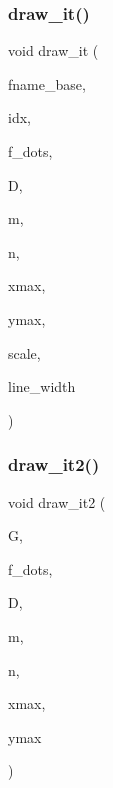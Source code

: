 \subsubsection{\texorpdfstring{draw\+\_\+it()}{draw\_it()}}
{\footnotesize\ttfamily void draw\+\_\+it (\begin{DoxyParamCaption}\item[{const \mbox{\hyperlink{galois_8h_ab6cc7b4aeb6ea31aba2b3fbfc83ff5e6}{B\+Y\+TE}} $\ast$}]{fname\+\_\+base,  }\item[{\mbox{\hyperlink{galois_8h_a09fddde158a3a20bd2dcadb609de11dc}{I\+NT}}}]{idx,  }\item[{\mbox{\hyperlink{galois_8h_a09fddde158a3a20bd2dcadb609de11dc}{I\+NT}}}]{f\+\_\+dots,  }\item[{\mbox{\hyperlink{galois_8h_a122c4acf389c050379f00341fdcd5812}{U\+B\+Y\+TE}} $\ast$}]{D,  }\item[{\mbox{\hyperlink{galois_8h_a09fddde158a3a20bd2dcadb609de11dc}{I\+NT}}}]{m,  }\item[{\mbox{\hyperlink{galois_8h_a09fddde158a3a20bd2dcadb609de11dc}{I\+NT}}}]{n,  }\item[{\mbox{\hyperlink{galois_8h_a09fddde158a3a20bd2dcadb609de11dc}{I\+NT}}}]{xmax,  }\item[{\mbox{\hyperlink{galois_8h_a09fddde158a3a20bd2dcadb609de11dc}{I\+NT}}}]{ymax,  }\item[{double}]{scale,  }\item[{double}]{line\+\_\+width }\end{DoxyParamCaption})}

\mbox{\label{plot__decomposition__matrix_8_c_ac1625003fdeabc86385385f169bd3e21}} 
\subsubsection{\texorpdfstring{draw\+\_\+it2()}{draw\_it2()}}
{\footnotesize\ttfamily void draw\+\_\+it2 (\begin{DoxyParamCaption}\item[{\mbox{\hyperlink{classmp__graphics}{mp\+\_\+graphics}} \&}]{G,  }\item[{\mbox{\hyperlink{galois_8h_a09fddde158a3a20bd2dcadb609de11dc}{I\+NT}}}]{f\+\_\+dots,  }\item[{\mbox{\hyperlink{galois_8h_a122c4acf389c050379f00341fdcd5812}{U\+B\+Y\+TE}} $\ast$}]{D,  }\item[{\mbox{\hyperlink{galois_8h_a09fddde158a3a20bd2dcadb609de11dc}{I\+NT}}}]{m,  }\item[{\mbox{\hyperlink{galois_8h_a09fddde158a3a20bd2dcadb609de11dc}{I\+NT}}}]{n,  }\item[{\mbox{\hyperlink{galois_8h_a09fddde158a3a20bd2dcadb609de11dc}{I\+NT}}}]{xmax,  }\item[{\mbox{\hyperlink{galois_8h_a09fddde158a3a20bd2dcadb609de11dc}{I\+NT}}}]{ymax }\end{DoxyParamCaption})}

